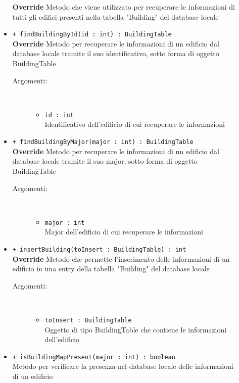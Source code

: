 \documentclass[../DefinizioneDiProdotto.tex]{subfiles}
\begin{document}
\begin{description}
\begin{itemize}
\textbf{Override} Metodo che viene utilizzato per recuperare le informazioni di tutti gli edifici presenti nella tabella "Building" del database locale
 \item \texttt{+ findBuildingById(id : int) : BuildingTable}\\
\textbf{Override} Metodo per recuperare le informazioni di un edificio dal database locale tramite il suo identificativo, sotto forma di oggetto BuildingTable
 \begin{description}
\item[Argomenti:] \
\begin{itemize}
\item \texttt{id : int}\\
Identificativo dell'edificio di cui recuperare le informazioni\end{itemize}
\end{description}
\item \texttt{+ findBuildingByMajor(major : int) : BuildingTable}\\
\textbf{Override} Metodo per recuperare le informazioni di un edificio dal database locale tramite il suo major, sotto forma di oggetto BuildingTable
 \begin{description}
\item[Argomenti:] \
\begin{itemize}
\item \texttt{major : int}\\
Major dell'edificio di cui recuperare le informazioni\end{itemize}
\end{description}
\item \texttt{+ insertBuilding(toInsert : BuildingTable) : int}\\
\textbf{Override} Metodo che permette l'inserimento delle informazioni di un edificio in una entry della tabella "Building" del database locale
 \begin{description}
\item[Argomenti:] \
\begin{itemize}
\item \texttt{toInsert : BuildingTable}\\
Oggetto di tipo BuildingTable che contiene le informazioni dell'edificio\end{itemize}
\end{description}
\item \texttt{+ isBuildingMapPresent(major : int) : boolean}\\
Metodo per verificare la presenza nel database locale delle informazioni di un edificio

\end{itemize}
\end{description}
\end{document}
